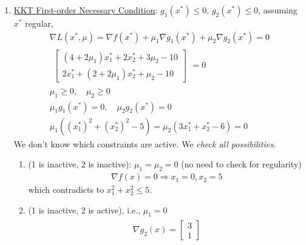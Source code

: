 \documentclass[11pt,a4paper]{article}
\begin{document}
\begin{enumerate}[$\bullet$]
    \item \underline{KKT First-order Necessary Condition}: $g_1(x^*)\leq 0$, $g_2(x^*)\leq 0$, assuming $x^*$ regular,
    \begin{equation}
        \begin{aligned}
            \nabla L(x^*,\mu)=\nabla f(x^*)+\mu_1 \nabla g_1(x^*)+\mu_2 \nabla g_2(x^*)=0\\
            \begin{aligned}
                \begin{bmatrix}
                    (4+2\mu_1)x^*_1+2x^*_2+3\mu_2-10\\
                    2x^*_1+(2+2\mu_1)x^*_2+\mu_2-10
                \end{bmatrix}
            \end{aligned}=0\\
            \mu_1\geq 0,\quad \mu_2\geq 0\\
            \mu_1g_1(x^*)=0,\quad \mu_2g_2(x^*)=0\\
            \mu_1((x_1^*)^2+(x_2^*)^2-5)=\mu_2(3x^*_1+x^*_2-6)=0
        \end{aligned}
        \nonumber
    \end{equation}
    We don't know which constraints are active. We \textit{check all possibilities}.
    \begin{enumerate}[(1)]
        \item (1 is inactive, 2 is inactive): $\mu_1=\mu_2=0$ (no need to check for regularity)
        \begin{equation}
            \begin{aligned}
                \nabla f(x)=0 \Rightarrow x_1=0,x_2=5
            \end{aligned}
            \nonumber
        \end{equation}
        which contradicts to $x_1^2+x_2^2\leq 5$.
        \item (1 is inactive, 2 is active), i.e., $\mu_1=0$
        \begin{equation}
            \begin{aligned}
                \begin{aligned}
                    \nabla g_2(x)=\begin{bmatrix}
                        3\\
                        1
                    \end{bmatrix}
                \end{aligned}

\end{aligned}
\end{equation}
\end{enumerate}
\end{enumerate}
\end{document}
